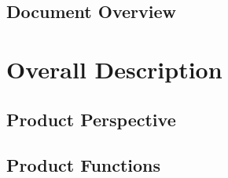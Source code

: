 \documentclass[english]{article}
\begin{document}
\subsection{Document Overview}

\newpage{}

\section{Overall Description}

\subsection{Product Perspective}

\subsection{Product Functions}
\end{document}
